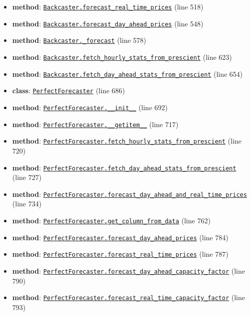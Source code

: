 \documentclass[11pt]{report}
\begin{document}
\begin{itemize}[leftmargin=*]
  \item \textbf{method}: \hyperref[def:forecaster.py:Backcaster.forecast_real_time_prices:L518]{\texttt{Backcaster.forecast\_real\_time\_prices}} (line 518)
  \item \textbf{method}: \hyperref[def:forecaster.py:Backcaster.forecast_day_ahead_prices:L548]{\texttt{Backcaster.forecast\_day\_ahead\_prices}} (line 548)
  \item \textbf{method}: \hyperref[def:forecaster.py:Backcaster._forecast:L578]{\texttt{Backcaster.\_forecast}} (line 578)
  \item \textbf{method}: \hyperref[def:forecaster.py:Backcaster.fetch_hourly_stats_from_prescient:L623]{\texttt{Backcaster.fetch\_hourly\_stats\_from\_prescient}} (line 623)
  \item \textbf{method}: \hyperref[def:forecaster.py:Backcaster.fetch_day_ahead_stats_from_prescient:L654]{\texttt{Backcaster.fetch\_day\_ahead\_stats\_from\_prescient}} (line 654)
  \item \textbf{class}: \hyperref[def:forecaster.py:PerfectForecaster:L686]{\texttt{PerfectForecaster}} (line 686)
  \item \textbf{method}: \hyperref[def:forecaster.py:PerfectForecaster.__init__:L692]{\texttt{PerfectForecaster.\_\_init\_\_}} (line 692)
  \item \textbf{method}: \hyperref[def:forecaster.py:PerfectForecaster.__getitem__:L717]{\texttt{PerfectForecaster.\_\_getitem\_\_}} (line 717)
  \item \textbf{method}: \hyperref[def:forecaster.py:PerfectForecaster.fetch_hourly_stats_from_prescient:L720]{\texttt{PerfectForecaster.fetch\_hourly\_stats\_from\_prescient}} (line 720)
  \item \textbf{method}: \hyperref[def:forecaster.py:PerfectForecaster.fetch_day_ahead_stats_from_prescient:L727]{\texttt{PerfectForecaster.fetch\_day\_ahead\_stats\_from\_prescient}} (line 727)
  \item \textbf{method}: \hyperref[def:forecaster.py:PerfectForecaster.forecast_day_ahead_and_real_time_prices:L734]{\texttt{PerfectForecaster.forecast\_day\_ahead\_and\_real\_time\_prices}} (line 734)
  \item \textbf{method}: \hyperref[def:forecaster.py:PerfectForecaster.get_column_from_data:L762]{\texttt{PerfectForecaster.get\_column\_from\_data}} (line 762)
  \item \textbf{method}: \hyperref[def:forecaster.py:PerfectForecaster.forecast_day_ahead_prices:L784]{\texttt{PerfectForecaster.forecast\_day\_ahead\_prices}} (line 784)
  \item \textbf{method}: \hyperref[def:forecaster.py:PerfectForecaster.forecast_real_time_prices:L787]{\texttt{PerfectForecaster.forecast\_real\_time\_prices}} (line 787)
  \item \textbf{method}: \hyperref[def:forecaster.py:PerfectForecaster.forecast_day_ahead_capacity_factor:L790]{\texttt{PerfectForecaster.forecast\_day\_ahead\_capacity\_factor}} (line 790)
  \item \textbf{method}: \hyperref[def:forecaster.py:PerfectForecaster.forecast_real_time_capacity_factor:L793]{\texttt{PerfectForecaster.forecast\_real\_time\_capacity\_factor}} (line 793)
\end{itemize}
\end{document}
